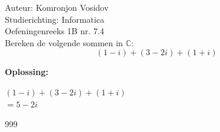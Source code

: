 \documentclass[a4paper]{article}
\begin{document}
	
	\noindent \large Auteur: Komronjon Vosidov \\
	\noindent \large Studierichting: Informatica\\
	\noindent \large Oefeningenreeks 1B nr. 7.4\\
	
	
	
	\normalsize
	Bereken de volgende sommen in $\mathbb{C}$:
	\begin{equation*}
		(1-i)+(3-2i)+(1+i)
	\end{equation*}
	
	
	\noindent \textbf{Oplossing:}
	
	$(1-i)+(3-2i)+(1+i)$ \\	
	
	$= 5-2i$ \\
	
\begin{thebibliography}{999}
	
\end{thebibliography}	
	
	
\end{document}
